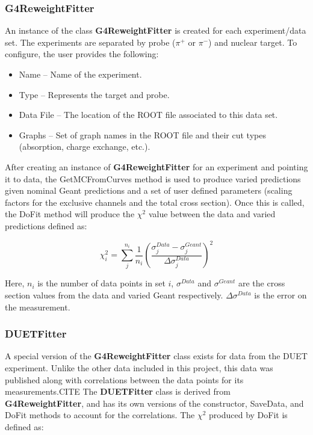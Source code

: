 \documentclass[12pt]{article}
\begin{document}
\subsubsection{G4ReweightFitter}
An instance of the class \textbf{G4ReweightFitter} is created for each experiment/data set. The experiments are separated by probe ($\pi^+$ or $\pi^-$) and nuclear target. To configure, the user provides the following:
\begin{itemize}
	\item Name -- Name of the experiment.
	\item Type -- Represents the target and probe.
	\item Data File -- The location of the ROOT file associated to this data set.
	\item Graphs -- Set of graph names in the ROOT file and their cut types (absorption, charge exchange, etc.).
\end{itemize}

After creating an instance of \textbf{G4ReweightFitter} for an experiment and pointing it to data, the GetMCFromCurves method is used to produce varied predictions given nominal  Geant predictions and a set of user defined parameters (scaling factors for the exclusive channels and the total cross section). Once this is called, the DoFit method will produce the $\chi^2$ value between the data and varied predictions defined as: 

\begin{equation}
\chi^2_{i} = \sum\limits_j^{n_i} \frac{1}{n_i}\left(\frac{\sigma_j^{Data} - \sigma_j^{Geant}}{\Delta\sigma_j^{Data}}\right)^2
\end{equation}

Here, $n_i$ is the number of data points in set $i$, $\sigma^{Data}$ and $\sigma^{Geant}$ are the cross section values from the data and varied Geant respectively. $\Delta\sigma^{Data}$ is the error on the measurement. 

\subsubsection{DUETFitter}
A special version of the \textbf{G4ReweightFitter} class exists for data from the DUET experiment. Unlike the other data included in this project, this data was published along with correlations between the data points for its measurements.CITE The \textbf{DUETFitter} class is derived from \textbf{G4ReweightFitter}, and has its own versions of the constructor, SaveData, and DoFit methods to account for the correlations. The $\chi^2$ produced by DoFit is defined as:
\end{document}
